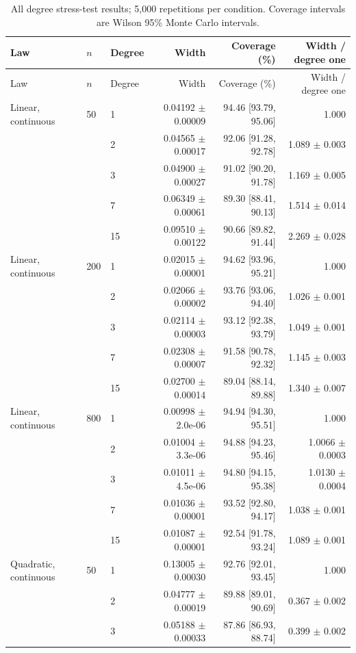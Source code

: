 \begingroup
\scriptsize
\begin{longtable}{lllrrr}
\caption{All degree stress-test results; 5,000 repetitions per condition. Coverage intervals are Wilson 95\% Monte Carlo intervals.}\\
\toprule
Law & $n$ & Degree & Width & Coverage (\%) & Width / degree one \\
\midrule
\endfirsthead
\toprule
Law & $n$ & Degree & Width & Coverage (\%) & Width / degree one \\
\midrule
\endhead
Linear, continuous & 50 & 1 & 0.04192 $\pm$ 0.00009 & 94.46 [93.79, 95.06] & 1.000 \\
 &  & 2 & 0.04565 $\pm$ 0.00017 & 92.06 [91.28, 92.78] & 1.089 $\pm$ 0.003 \\
 &  & 3 & 0.04900 $\pm$ 0.00027 & 91.02 [90.20, 91.78] & 1.169 $\pm$ 0.005 \\
 &  & 7 & 0.06349 $\pm$ 0.00061 & 89.30 [88.41, 90.13] & 1.514 $\pm$ 0.014 \\
 &  & 15 & 0.09510 $\pm$ 0.00122 & 90.66 [89.82, 91.44] & 2.269 $\pm$ 0.028 \\
Linear, continuous & 200 & 1 & 0.02015 $\pm$ 0.00001 & 94.62 [93.96, 95.21] & 1.000 \\
 &  & 2 & 0.02066 $\pm$ 0.00002 & 93.76 [93.06, 94.40] & 1.026 $\pm$ 0.001 \\
 &  & 3 & 0.02114 $\pm$ 0.00003 & 93.12 [92.38, 93.79] & 1.049 $\pm$ 0.001 \\
 &  & 7 & 0.02308 $\pm$ 0.00007 & 91.58 [90.78, 92.32] & 1.145 $\pm$ 0.003 \\
 &  & 15 & 0.02700 $\pm$ 0.00014 & 89.04 [88.14, 89.88] & 1.340 $\pm$ 0.007 \\
Linear, continuous & 800 & 1 & 0.00998 $\pm$ 2.0e-06 & 94.94 [94.30, 95.51] & 1.000 \\
 &  & 2 & 0.01004 $\pm$ 3.3e-06 & 94.88 [94.23, 95.46] & 1.0066 $\pm$ 0.0003 \\
 &  & 3 & 0.01011 $\pm$ 4.5e-06 & 94.80 [94.15, 95.38] & 1.0130 $\pm$ 0.0004 \\
 &  & 7 & 0.01036 $\pm$ 0.00001 & 93.52 [92.80, 94.17] & 1.038 $\pm$ 0.001 \\
 &  & 15 & 0.01087 $\pm$ 0.00001 & 92.54 [91.78, 93.24] & 1.089 $\pm$ 0.001 \\
Quadratic, continuous & 50 & 1 & 0.13005 $\pm$ 0.00030 & 92.76 [92.01, 93.45] & 1.000 \\
 &  & 2 & 0.04777 $\pm$ 0.00019 & 89.88 [89.01, 90.69] & 0.367 $\pm$ 0.002 \\
 &  & 3 & 0.05188 $\pm$ 0.00033 & 87.86 [86.93, 88.74] & 0.399 $\pm$ 0.002 \\

\end{longtable}
